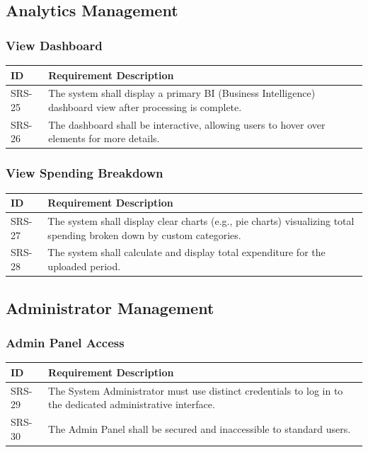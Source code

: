 \documentclass[11pt,a4paper]{report}
\begin{document}
\subsection{Analytics Management}

\subsubsection{View Dashboard}
\begin{longtable}{|p{2.5cm}|p{12cm}|}
	\hline
	\textbf{ID} & \textbf{Requirement Description} \\
	\hline
	SRS-25 & The system shall display a primary BI (Business Intelligence) dashboard view after processing is complete. \\ \hline
	SRS-26 & The dashboard shall be interactive, allowing users to hover over elements for more details. \\ \hline
\end{longtable}

\subsubsection{View Spending Breakdown}
\begin{longtable}{|p{2.5cm}|p{12cm}|}
	\hline
	\textbf{ID} & \textbf{Requirement Description} \\
	\hline
	SRS-27 & The system shall display clear charts (e.g., pie charts) visualizing total spending broken down by custom categories. \\ \hline
	SRS-28 & The system shall calculate and display total expenditure for the uploaded period. \\ \hline
\end{longtable}

\subsection{Administrator Management}

\subsubsection{Admin Panel Access}
\begin{longtable}{|p{2.5cm}|p{12cm}|}
	\hline
	\textbf{ID} & \textbf{Requirement Description} \\
	\hline
	SRS-29 & The System Administrator must use distinct credentials to log in to the dedicated administrative interface. \\ \hline
	SRS-30 & The Admin Panel shall be secured and inaccessible to standard users. \\ \hline
\end{longtable}
\end{document}

